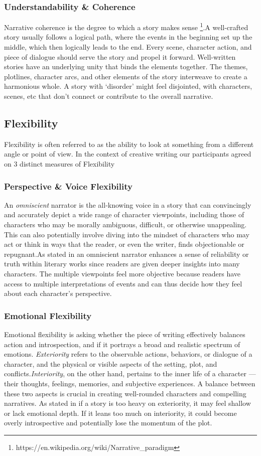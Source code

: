 \subsubsection{Understandability \& Coherence}
Narrative coherence is the degree to which a story makes sense  \footnote{https://en.wikipedia.org/wiki/Narrative\_paradigm}.A well-crafted story usually follows a logical path, where the events in the beginning set up the middle, which then logically leads to the end. Every scene, character action, and piece of dialogue should serve the story and propel it forward. Well-written stories have an underlying unity that binds the elements together. The themes, plotlines, character arcs, and other elements of the story interweave to create a harmonious whole. A story with `disorder' might feel disjointed, with characters, scenes, etc that don't connect or contribute to the overall narrative.

\subsection{Flexibility}
Flexibility is often referred to as the ability to look at something from a different angle or point of view. In the context of creative writing our participants agreed on 3 distinct measures of Flexibility
\subsubsection{Perspective \& Voice Flexibility}
An \textit{omniscient} narrator is the all-knowing voice in a story that can convincingly and accurately depict a wide range of character viewpoints, including those of characters who may be morally ambiguous, difficult, or otherwise unappealing. This can also potentially involve diving into the mindset of characters who may act or think in ways that the reader, or even the writer, finds objectionable or repugnant.As stated in \cite{friedman1955point} an omniscient narrator enhances a sense of reliability or truth within literary works since readers are given deeper insights into many characters. The multiple viewpoints feel more objective because readers have access to multiple interpretations of events and can thus decide how they feel about each character’s perspective.
\subsubsection{Emotional Flexibility}
Emotional flexibility is asking whether the piece of writing effectively balances action and introspection, and if it portrays a broad and realistic spectrum of emotions. \textit{Exteriority} refers to the observable actions, behaviors, or dialogue of a character, and the physical or visible aspects of the setting, plot, and conflicts.\textit{Interiority}, on the other hand, pertains to the inner life of a character — their thoughts, feelings, memories, and subjective experiences. A balance between these two aspects is crucial in creating well-rounded characters and compelling narratives. As stated in \cite{campe2014rethinking} if a story is too heavy on exteriority, it may feel shallow or lack emotional depth. If it leans too much on interiority, it could become overly introspective and potentially lose the momentum of the plot.
